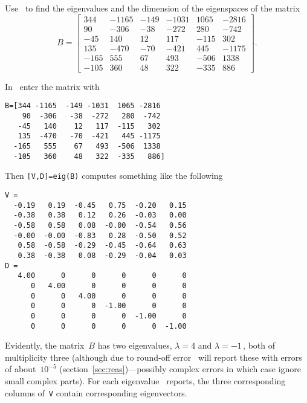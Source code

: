 \begin{example} \label{eg:}
Use \script\ to find the eigenvalues and the dimension of the eigenspaces of the matrix 
\begin{equation*}
B=\begin{bmatrix} 344&-1165&-149&-1031&1065&-2816
\\90&-306&-38&-272&280&-742
\\-45&140&12&117&-115&302
\\135&-470&-70&-421&445&-1175
\\-165&555&67&493&-506&1338
\\-105&360&48&322&-335&886 \end{bmatrix}.
\end{equation*}

\begin{solution} 
In \script\ enter the matrix with
\begin{verbatim}
B=[344 -1165  -149 -1031  1065 -2816
    90  -306   -38  -272   280  -742
   -45   140    12   117  -115   302
   135  -470   -70  -421   445 -1175
  -165   555    67   493  -506  1338
  -105   360    48   322  -335   886]
\end{verbatim}
\setbox\ajrqrbox\hbox{}%
\marginpar{\usebox{\ajrqrbox}}%
Then \verb|[V,D]=eig(B)| computes something like the following \twodp
\begin{verbatim}
V =
  -0.19   0.19  -0.45   0.75  -0.20   0.15
  -0.38   0.38   0.12   0.26  -0.03   0.00
  -0.58   0.58   0.08  -0.00  -0.54   0.56
  -0.00  -0.00  -0.83   0.28  -0.50   0.52
   0.58  -0.58  -0.29  -0.45  -0.64   0.63
   0.38  -0.38   0.08  -0.29  -0.04   0.03
D =
   4.00      0      0      0      0      0
      0   4.00      0      0      0      0
      0      0   4.00      0      0      0
      0      0      0  -1.00      0      0
      0      0      0      0  -1.00      0
      0      0      0      0      0  -1.00
\end{verbatim}
Evidently, the matrix~\(B\) has two eigenvalues, \(\lambda=4\) and \(\lambda=-1\)\,, both of multiplicity three (although due to round-off error \script\ will report these with errors of about~\(10^{-5}\) (section~\ref{sec:reas})---possibly complex errors in which case ignore small complex parts).
For each eigenvalue \script\ reports, the three corresponding columns of~\verb|V| contain corresponding eigenvectors.

\end{solution}
\end{example}
